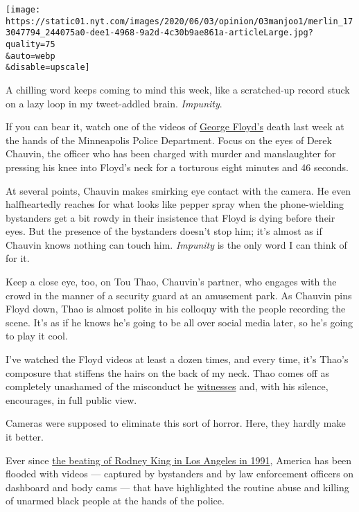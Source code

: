 \texttt{[image: https://static01.nyt.com/images/2020/06/03/opinion/03manjoo1/merlin\_173047794\_244075a0-dee1-4968-9a2d-4c30b9ae861a-articleLarge.jpg?quality=75\\\&auto=webp\\\&disable=upscale]}

A chilling word keeps coming to mind this week, like a scratched-up
record stuck on a lazy loop in my tweet-addled brain. \emph{Impunity}.

If you can bear it, watch one of the videos of
\href{https://www.nytimes.com/2020/06/04/us/politics/george-floyd-witness-maurice-lester-hall.html}{George
Floyd's} death last week at the hands of the Minneapolis Police
Department. Focus on the eyes of Derek Chauvin, the officer who has been
charged with murder and manslaughter for pressing his knee into Floyd's
neck for a torturous eight minutes and 46 seconds.

At several points, Chauvin makes smirking eye contact with the camera.
He even halfheartedly reaches for what looks like pepper spray when the
phone-wielding bystanders get a bit rowdy in their insistence that Floyd
is dying before their eyes. But the presence of the bystanders doesn't
stop him; it's almost as if Chauvin knows nothing can touch him.
\emph{Impunity} is the only word I can think of for it.

Keep a close eye, too, on Tou Thao, Chauvin's partner, who engages with
the crowd in the manner of a security guard at an amusement park. As
Chauvin pins Floyd down, Thao is almost polite in his colloquy with the
people recording the scene. It's as if he knows he's going to be all
over social media later, so he's going to play it cool.

I've watched the Floyd videos at least a dozen times, and every time,
it's Thao's composure that stiffens the hairs on the back of my neck.
Thao comes off as completely unashamed of the misconduct he
\href{https://www.nytimes.com/2020/06/04/us/politics/george-floyd-witness-maurice-lester-hall.html}{witnesses}
and, with his silence, encourages, in full public view.

Cameras were supposed to eliminate this sort of horror. Here, they
hardly make it better.

Ever since
\href{https://www.nytimes.com/1991/03/07/us/tape-of-beating-by-police-revives-charges-of-racism.html}{the
beating of Rodney King in Los Angeles in 1991}, America has been flooded
with videos --- captured by bystanders and by law enforcement officers
on dashboard and body cams --- that have highlighted the routine abuse
and killing of unarmed black people at the hands of the police.


